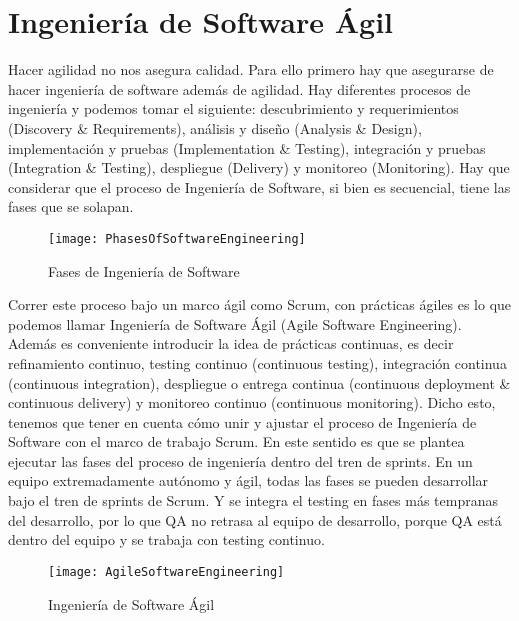 \chapter{Ingeniería de Software Ágil}

Hacer agilidad no nos asegura calidad. Para ello primero hay que asegurarse de hacer ingeniería de software además de agilidad. Hay diferentes procesos de ingeniería y podemos tomar el siguiente: descubrimiento y requerimientos (Discovery \& Requirements), análisis y diseño (Analysis \& Design), implementación y pruebas (Implementation \& Testing), integración y pruebas (Integration \& Testing), despliegue (Delivery) y monitoreo (Monitoring). Hay que considerar que el proceso de Ingeniería de Software, si bien es secuencial, tiene las fases que se solapan. 

\begin{figure}[h]
  \centering
  \texttt{[image: PhasesOfSoftwareEngineering]}
  \caption{Fases de Ingeniería de Software}
  \centering
  \label{fig:PhasesOfSoftwareEngineering} %
\end{figure}

Correr este proceso bajo un marco ágil como Scrum, con prácticas ágiles es lo que podemos llamar Ingeniería de Software Ágil (Agile Software Engineering). Además es conveniente introducir la idea de prácticas continuas, es decir refinamiento continuo, testing continuo (continuous testing), integración continua (continuous integration), despliegue o entrega continua (continuous deployment \& continuous delivery) y monitoreo continuo (continuous monitoring). 
Dicho esto, tenemos que tener en cuenta cómo unir y ajustar el proceso de Ingeniería de Software con el marco de trabajo Scrum. En este sentido es que se plantea ejecutar las fases del proceso de ingeniería dentro del tren de sprints. En un equipo extremadamente autónomo y ágil, todas las fases se pueden desarrollar bajo el tren de sprints de Scrum. Y se integra el testing en fases más tempranas del desarrollo, por lo que QA no retrasa al equipo de desarrollo, porque QA está dentro del equipo y se trabaja con testing continuo.

\begin{figure}[h]
  \centering
  \texttt{[image: AgileSoftwareEngineering]}
  \caption{Ingeniería de Software Ágil}
  \centering
  \label{fig:AgileSoftwareEngineering} %
\end{figure}
